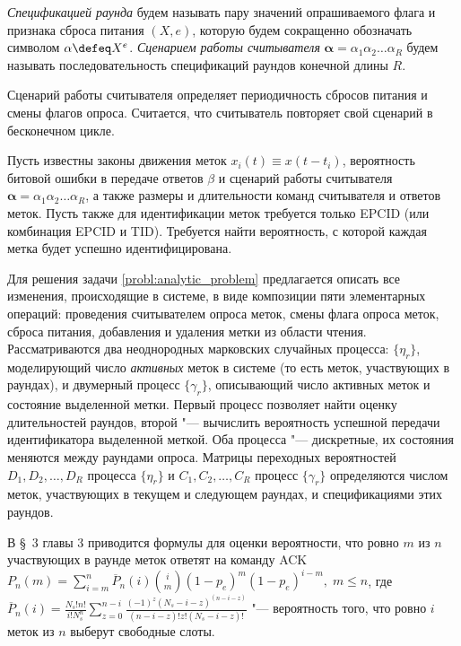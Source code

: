 \begin{defn}
\textit{Спецификацией раунда} будем называть пару значений опрашиваемого флага и признака сброса питания $(X, e)$, которую будем сокращенно обозначать символом $\alpha \defeq X^{e}$. \textit{Сценарием работы считывателя} $\bm{\alpha} = \alpha_1 \alpha_2 \dots \alpha_R$ будем называть последовательность спецификаций раундов конечной длины $R$.
\end{defn}

Сценарий работы считывателя определяет периодичность сбросов питания и смены флагов опроса. Считается, что считыватель повторяет свой сценарий в бесконечном цикле.

\begin{probl}\label{probl:analytic_problem}
  Пусть известны законы движения меток $x_i(t) \equiv x(t - t_i)$, вероятность битовой ошибки в передаче ответов $\beta$ и сценарий работы считывателя $\bm{\alpha} = \alpha_1 \alpha_2 \dots \alpha_R$, а также размеры и длительности команд считывателя и ответов меток. Пусть также для идентификации меток требуется только EPCID (или комбинация EPCID и TID). Требуется найти вероятность, с которой каждая метка будет успешно идентифицирована. 
\end{probl}

Для решения задачи \ref{probl:analytic_problem} предлагается описать все изменения, происходящие в системе, в виде композиции пяти элементарных операций: проведения считывателем опроса меток, смены флага опроса меток, сброса питания, добавления и удаления метки из области чтения. Рассматриваются два неоднородных марковских случайных процесса: $\{ \eta_r \}$, моделирующий число \textit{активных} меток в системе (то есть меток, участвующих в раундах), и двумерный процесс $\{ \gamma_r \}$, описывающий число активных меток и состояние выделенной метки. Первый процесс позволяет найти оценку длительностей раундов, второй "--- вычислить вероятность успешной передачи идентификатора выделенной меткой. Оба процесса "--- дискретные, их состояния меняются между раундами опроса. Матрицы переходных вероятностей $D_1, D_2, \dots, D_R$ процесса $\{ \eta_r \}$ и $C_1, C_2, \dots, C_R$ процесс $\{ \gamma_r \}$ определяются числом меток, участвующих в текущем и следующем раундах, и спецификациями этих раундов. 

В \S~3 главы 3 приводится формулы для оценки вероятности, что ровно $m$ из $n$ участвующих в раунде меток ответят на команду ACK $P_n(m) = \sum_{i=m}^n \overline{P}_n(i) {i \choose m}\left( 1 - p_e \right)^m \left( 1 - p_e \right)^{i - m},\; m \leqslant n$, где $\overline{P}_n(i) = \frac{N_s! n!}{i! N_s^n} \sum\limits_{z=0}^{n-i} \frac{(-1)^z (N_s - i - z)^{(n - i - z)}}{(n - i - z)! z! (N_s - i - z)!}$ "--- вероятность того, что ровно $i$ меток из $n$ выберут свободные слоты. 

